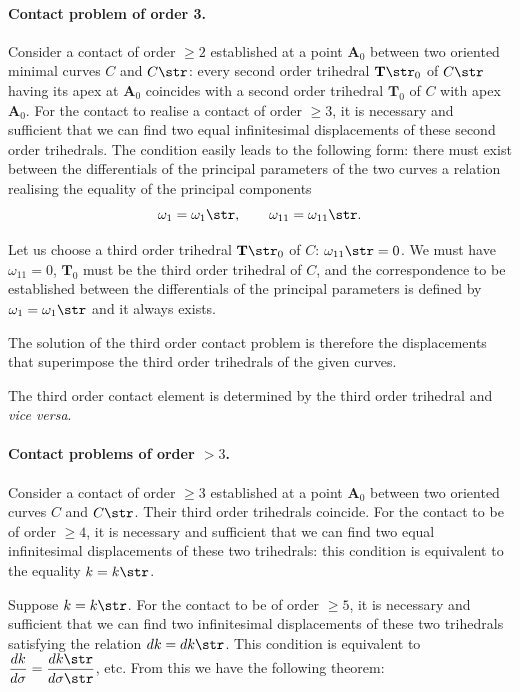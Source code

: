 \paragraph{Contact problem of order 3.}
\label{sec:34}
Consider a contact of order $\ge 2$ established at a point $\mathbf{A}_{0}$ between two oriented minimal curves $C$ and $C\str$: every second order trihedral $\mathbf{T}\str_{0}$ of $C\str$ having its apex at $\mathbf{A}_{0}$ coincides with a second order trihedral $\mathbf{T}_{0}$ of $C$ with apex $\mathbf{A}_{0}$. For the contact to realise a contact of order $\ge 3$, it is necessary and sufficient that we can find two equal infinitesimal displacements of these second order trihedrals. The condition easily leads to the following form: there must exist between the differentials of the principal parameters of the two curves a relation realising the equality of the principal components
\[
\omega_{1}=\omega_{1}\str,\qquad\omega_{11}=\omega_{11}\str.
\]

Let us choose a third order trihedral $\mathbf{T}\str_{0}$ of $C$: $\omega_{11}\str=0$. We must have $\omega_{11}=0$, $\mathbf{T}_{0}$ must be the third order trihedral of ${C}$, and the correspondence to be established between the differentials of the principal parameters is defined by $\omega_{1}=\omega_{1}\str$ and it always exists.

The solution of the third order contact problem is therefore the displacements that superimpose the third order trihedrals of the given curves.

The third order contact element is determined by the third order trihedral and \emph{vice versa}.

\paragraph{Contact problems of order $>3$.}
\label{sec:35}
Consider a contact of order $\ge 3$ established at a point $\mathbf{A}_{0}$ between two oriented curves $C$ and $C\str$. Their third order trihedrals coincide. For the contact to be of order $\ge 4$, it is necessary and sufficient that we can find two equal infinitesimal displacements of these two trihedrals: this condition is equivalent to the equality $k=k\str$.

Suppose $k=k\str$. For the contact to be of order $\ge 5$, it is necessary and sufficient that we can find two infinitesimal displacements of these two trihedrals satisfying the relation $dk=dk\str$. This condition is equivalent to $\dfrac{dk}{d\sigma}=\dfrac{dk\str}{d\sigma\str}$, etc. From this we have the following theorem:


